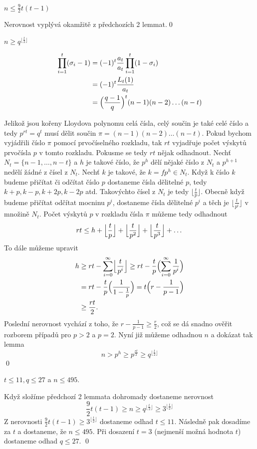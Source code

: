 \lm $n \leq \frac{9}{2} t(t-1)$

\dk Nerovnost vyplývá okamžitě z předchozích 2 lemmat.\qed

\lm $n \geq q^{\lfloor \frac{t}{2} \rfloor}$

\dk
\begin{align*}
\prod\limits_{i = 1}^t (\sigma_i - 1) &= (-1)^t \frac{a_t}{a_t} \prod\limits_{i = 1}^t (1 - \sigma_i) \\
&= (-1)^t \frac{L_t(1)}{a_t} \\
&= \Bigl(\frac{q-1}{q}\Bigr)^t (n-1)(n-2)\dots(n-t)
\end{align*}

Jelikož jsou kořeny Lloydova polynomu celá čísla, celý součin je také celé číslo a tedy $p^{rt} = q^t$ musí dělit součin $\pi = (n-1)(n-2)\dots(n-t)$. Pokud bychom vyjádřili číslo $\pi$ pomocí prvočíselného rozkladu, tak $rt$ vyjadřuje počet výskytů prvočísla $p$ v tomto rozkladu. Pokusme se tedy $rt$ nějak odhadnout. Nechť $ N_t = \{n-1,\dots,n-t\}$ a $h$ je takové číslo, že $p^h$ dělí nějaké číslo z $N_t$ a $p^{h+1}$ nedělí žádné z čísel z $N_t$. Nechť $k$ je takové, že $k = fp^h \in N_t$. Když k číslo $k$ budeme přičítat či odčítat číslo $p$ dostaneme čísla dělitelné $p$, tedy $k + p, k - p, k + 2p, k - 2p$ atd. Takovýchto čísel z $N_t$ je tedy $\lfloor \frac{t}{p} \rfloor$. Obecně když budeme přičítat odčítat mocninu $p^i$, dostaneme čísla dělitelné $p^i$ a těch je $\lfloor \frac{t}{p^i} \rfloor$ v množině $N_t$. Počet výskytů $p$ v rozkladu čísla $\pi$ můžeme tedy odhadnout
\[
rt \leq h + \Bigl\lfloor \frac{t}{p} \Bigr\rfloor + \Bigl\lfloor \frac{t}{p^2} \Bigr\rfloor + \Bigl\lfloor \frac{t}{p^3} \Bigr\rfloor + \dots
\]
To dále můžeme upravit
\begin{align*}
h &\geq rt - \sum\limits_{i=0}^\infty \Bigl\lfloor \frac{t}{p^i} \Bigr\rfloor 
 \geq rt - \frac{t}{p} \Bigl(\sum\limits_{i=0}^\infty  \frac{1}{p^i} \Bigr) \\
& = rt - \frac{t}{p}\Bigl(\frac{1}{1-\frac{1}{p}}\Bigr) 
= t \Bigl(r - \frac{1}{p-1} \Bigr) \\
& \geq \frac{rt}{2}.
\end{align*}
Poslední nerovnost vychází z toho, že $r - \frac{1}{p-1} \geq \frac{r}{2}$, což se dá snadno ověřit rozborem případů pro $p > 2$ a $p = 2$. Nyní již můžeme odhadnou $n$ a dokázat tak lemma
\[
n > p^h \geq p^{\frac{rt}{2}} \geq q^{\lfloor\frac{t}{2}\rfloor}
\]
\qed

\lm $t \leq 11, q \leq 27$ a $n \leq 495$.

\dk Když složíme předchozí 2 lemmata dohromady dostaneme nerovnost
\[
\frac{9}{2}t(t-1) \geq n \geq q^{\lfloor\frac{t}{2}\rfloor} \geq 3^{\lfloor\frac{t}{2}\rfloor}
\]
Z nerovnosti $\frac{9}{2}t(t-1) \geq 3^{\lfloor\frac{t}{2}\rfloor}$ dostaneme odhad $t \leq 11$. Následně pak dosadíme za $t$ a dostaneme, že $n \leq 495$. Při dosazení $t=3$ (nejmenší možná hodnota $t$) dostaneme odhad $q \leq 27$. \qed

